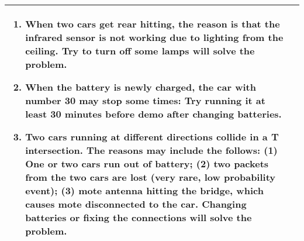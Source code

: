 \begin{center}
\begin{tabular}{ | p{2cm} | p{10cm} | }
\begin{enumerate}
		\item When two cars get rear hitting, the reason is that the infrared sensor is not working due to lighting from the ceiling. Try to turn off some lamps will solve the problem.
		\item When the battery is newly charged, the car with number 30 may stop some times: Try running it at least 30 minutes before demo after changing batteries.
		\item Two cars running at different directions collide in a T intersection. The reasons may include the follows: (1) One or two cars run out of battery; (2) two packets from the two cars are lost (very rare, low probability event); (3) mote antenna hitting the bridge, which causes mote disconnected to the car. Changing batteries or fixing the connections will solve the problem.
		\end{enumerate}  \\
		\hline
	\end{tabular}
\end{center}

